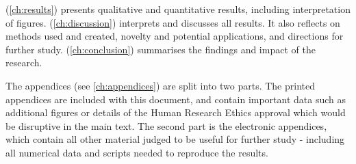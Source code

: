  (\cref{ch:results}) presents qualitative and
quantitative results, including interpretation of figures.
 (\cref{ch:discussion}) interprets and discusses
all results.  It also reflects on methods used and created, novelty and
potential applications, and directions for further study.
 (\cref{ch:conclusion}) summarises the findings
and impact of the research.

The appendices (see \cref{ch:appendices}) are split into two parts.
The printed appendices are included with this document, and contain
important data such as additional figures or details of the Human Research Ethics
approval which would be disruptive in the main text.  The second part
is the electronic appendices, which contain all other material judged to
be useful for further study - including all numerical data and scripts
needed to reproduce the results.

